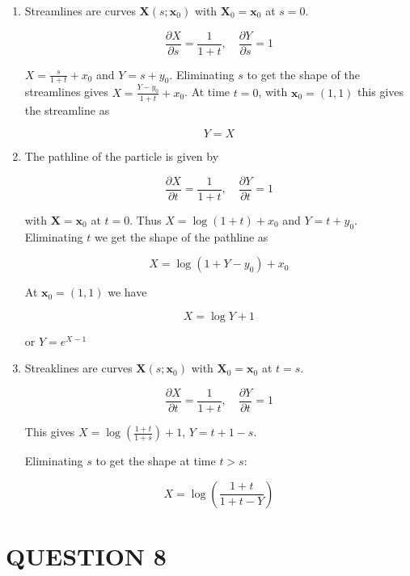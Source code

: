 \documentclass[a4paper]{article}
\begin{document}
\begin{enumerate}
	\item Streamlines are curves $ \mathbf{X}(s; \mathbf{x}_{0}) $ with $ \mathbf{X}_{0} = \mathbf{x}_{0} $ at $ s = 0 $. 
	
	\[ \frac{\partial X }{\partial s} = \frac{1}{1+t}, \quad \frac{\partial Y }{\partial s} = 1 \]
	
	$ X = \frac{s}{1+t} + x_{0} $ and $ Y = s + y_{0} $. Eliminating $ s $ to get the shape of the streamlines gives $ X = \frac{Y - y_{0}}{1+t} + x_{0} $. At time $ t = 0 $, with $ \mathbf{x}_{0} = (1,1) $ this gives the streamline as
	
	\[ Y = X \]
	
	
	
	\item The pathline of the particle is given by
	
	\[ \frac{\partial X }{\partial t} = \frac{1}{1+t}, \quad \frac{\partial Y }{\partial t} = 1 \]
	
	with $ \mathbf{X} = \mathbf{x}_{0} $ at $ t = 0 $. Thus $ X = \log(1+t) + x_{0} $ and $ Y = t + y_{0} $. Eliminating $ t $ we get the shape of the pathline as
	
	\[ X = \log(1+ Y - y_{0}) + x_{0} \]
	
	At $ \mathbf{x}_{0} = (1,1) $ we have
	
	\[ X = \log Y + 1 \]
	
	or $ Y = e^{X - 1} $
	
	
	
	\item Streaklines are curves $ \mathbf{X}(s; \mathbf{x}_{0}) $ with $ \mathbf{X}_{0} = \mathbf{x}_{0} $ at $ t = s $.
	
	\[ \frac{\partial X }{\partial t} = \frac{1}{1+t}, \quad \frac{\partial Y }{\partial t} = 1 \]
	
	This gives $ X = \log \left(  \frac{1+t}{1+s} \right) + 1  $, $ Y = t + 1 - s   $. 
	
	Eliminating $ s $ to get the shape at time $ t > s $:
	
	\[ X = \log \left(  \frac{1+t}{1+t - Y} \right)  \]
	
	
	
	
\end{enumerate}





\section{QUESTION 8}
\end{document}
